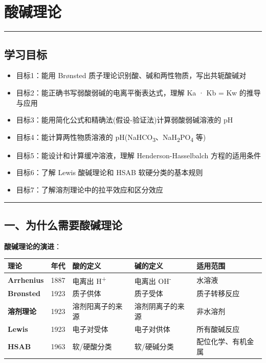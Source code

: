 \section{酸碱理论}\label{ux9178ux78b1ux7406ux8bba}

\begin{center}\rule{0.5\linewidth}{0.5pt}\end{center}

\subsection{学习目标}\label{ux5b66ux4e60ux76eeux6807}

\begin{itemize}
\tightlist
\item
  目标1：能用 Brønsted 质子理论识别酸、碱和两性物质，写出共轭酸碱对
\item
  目标2：能正确书写弱酸弱碱的电离平衡表达式，理解 Ka · Kb = Kw 的推导与应用
\item
  目标3：能用简化公式和精确法(假设-验证法)计算弱酸弱碱溶液的 pH
\item
  目标4：能计算两性物质溶液的 pH(NaHCO\textsubscript{3}、NaH\textsubscript{2}PO\textsubscript{4} 等)
\item
  目标5：能设计和计算缓冲溶液，理解 Henderson-Hasselbalch 方程的适用条件
\item
  目标6：了解 Lewis 酸碱理论和 HSAB 软硬分类的基本规则
\item
  目标7：了解溶剂理论中的拉平效应和区分效应
\end{itemize}

\begin{center}\rule{0.5\linewidth}{0.5pt}\end{center}

\subsection{一、为什么需要酸碱理论}\label{ux4e00ux4e3aux4ec0ux4e48ux9700ux8981ux9178ux78b1ux7406ux8bba}

\textbf{酸碱理论的演进}：

{\def\LTcaptype{none} %
\begin{longtable}[]{@{}lclll@{}}
\toprule\noalign{}
理论 & 年代 & 酸的定义 & 碱的定义 & 适用范围 \\
\midrule\noalign{}
\endhead
\bottomrule\noalign{}
\endlastfoot
\textbf{Arrhenius} & 1887 & 电离出 H\textsuperscript{+} & 电离出 OH\textsuperscript{-} & 水溶液 \\
\textbf{Brønsted} & 1923 & 质子供体 & 质子受体 & 质子转移反应 \\
\textbf{溶剂理论} & 1923 & 溶剂阳离子的来源 & 溶剂阴离子的来源 & 非水溶剂 \\
\textbf{Lewis} & 1923 & 电子对受体 & 电子对供体 & 所有酸碱反应 \\
\textbf{HSAB} & 1963 & 软/硬酸分类 & 软/硬碱分类 & 配位化学、有机金属 \\
\end{longtable}
}

